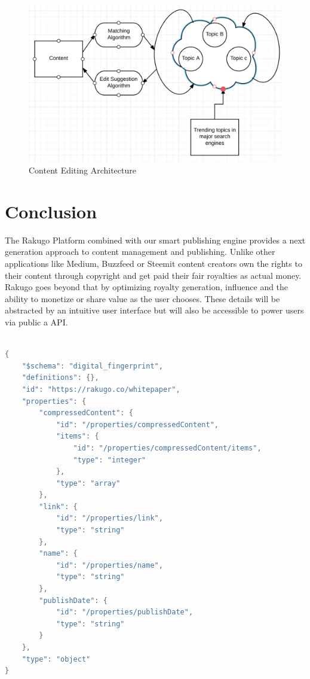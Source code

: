 \documentclass{article}
\begin{document}
\begin{figure}[H]
\centering
\includegraphics[scale=0.60]{smart_publishing_engine.png}
\caption{Content Editing Architecture}
\end{figure}

\section{Conclusion}
The Rakugo Platform combined with our smart publishing engine provides a next generation approach to content management and publishing. Unlike other applications like Medium, Buzzfeed or Steemit content creators own the rights to their content through copyright and get paid their fair royalties as actual money. Rakugo goes beyond that by optimizing royalty generation, influence and the ability to monetize or share value as the user chooses. These details will be abstracted by an intuitive user interface but will also be accessible to power users via public a API.

\newpage

\renewcommand{\lstlistingname}{Appendix}
\begin{lstlisting}[caption={Digital Fingerprint},captionpos=b, language=java,numbers=none]

{
    "$schema": "digital_fingerprint",
    "definitions": {},
    "id": "https://rakugo.co/whitepaper",
    "properties": {
        "compressedContent": {
            "id": "/properties/compressedContent",
            "items": {
                "id": "/properties/compressedContent/items",
                "type": "integer"
            },
            "type": "array"
        },
        "link": {
            "id": "/properties/link",
            "type": "string"
        },
        "name": {
            "id": "/properties/name",
            "type": "string"
        },
        "publishDate": {
            "id": "/properties/publishDate",
            "type": "string"
        }
    },
    "type": "object"
}

\end{lstlisting}


\end{document}
